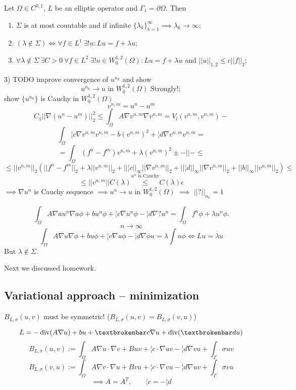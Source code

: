 \documentclass[12pt]{article}					%
\begin{document}
\begin{veta}
	Let $\Omega \in C^{0, 1}$, $L$ be an elliptic operator and $\Gamma_1 = \partial \Omega$. Then
	\begin{enumerate}
		\item $\Sigma$ is at most countable and if infinite $\{\lambda_k\}_{k=1}^∞ \implies \lambda_k \rightarrow ∞$;
		\item $(\lambda \notin \Sigma) \Leftrightarrow \forall f \in L^1\ \exists! u: Lu = f + \lambda u$;
		\item $\forall \lambda \notin \Sigma\ \exists C > 0\ \forall f \in L^2\ \exists! u \in W_0^{1,2}(\Omega): Lu = f + \lambda u$ and $||u||_{1,2} ≤ c ||f||_2$;
	\end{enumerate}

	\begin{dukazin}
		3) TODO
		improve convergence of $u^{n_k}$ and show
		$$ u^{n_k} \rightarrow u \text{ in } W_0^{1, 2}(\Omega) \text{ Strongly!}; $$
		show $\{u^{n_k}\}$ is Cauchy in $W_0^{1, 2}(\Omega)$
		$$ v^{n, m} = u^n - u^m $$
		$$ C_1||\nabla (u^n - u^m)||_2^2 ≤ \int_{\Omega} A \nabla v^{n, m} \nabla v^{n, m} = V_l(v^{n, m}, v^{n, m}) - $$
		$$ \int_\Omega ¦c \nabla  v^{n, m}v^{n, m} - b(v^{n, m})^2 + ¦d \nabla v^{n, m}v^{n, m} = $$
		$$ = \int_\Omega (f^n - f^m) v^{n, m} + \lambda(v^{n, m})^2 ± -||- ≤ $$
		$$ ≤ ||v^{n, m}||_2 (||f^n - f^m||_2 + \lambda ||v^{n, m}||_2 + ||¦c||_∞ ||\nabla v^{n, m}||_2 + ||¦d||_∞ ||\nabla v^{n, m}||_2 + ||b||_∞ ||v^{n, m}||_2) ≤$$
		$$ ≤ ||v^{n, m}|| C(\lambda) \overset{u^n \text{ is Cauchy}} ≤ C(\lambda) \epsilon $$
		$\implies \nabla u^n$ is Cauchy sequence $\implies u^n \rightarrow u$ in $W_0^{1, 2}(\Omega)$ $\implies$ $||?||_{n_k} = 1$

		$$ \int_\Omega A \nabla a u^n \nabla a \phi + b u^n \phi + ¦c \nabla u^n \phi - ¦d \nabla ? u^n = \int_\Omega f^n \phi + \lambda u^n \phi. $$
		$$ n \rightarrow ∞ $$
		$$ \int_\Omega A \nabla u \nabla \phi + b u \phi + ¦c \nabla u \phi - ¦d \nabla \phi u = \lambda \int u \phi \Leftrightarrow Lu = \lambda u $$
		But $\lambda \notin \Sigma$.
	\end{dukazin}
\end{veta}

\begin{poznamka}
	Next we discussed homework.
\end{poznamka}


\subsection{Variational approach – minimization}
\begin{poznamka}
	$B_{L, \sigma}(u, v)$ must be symmetric! ($B_{L, \sigma}(u, v) = B_{L, \sigma}(v, u)$)

	$$ L = - \Div (A \nabla u) + b u + ¦c \nabla u + \Div (¦d u) $$
	$$ B_{L, \sigma}(u, v) := \int_{\Omega} A \nabla u·\nabla v + B u v + ¦c·\nabla u v - ¦d \nabla v u + \int_{\Gamma} \sigma u v $$
	$$ B_{L, \sigma}(v, u) := \int_{\Omega} A \nabla v·\nabla u + B v u + ¦c·\nabla v u - ¦d \nabla u v + \int_{\Gamma} \sigma v u $$
	$$ \implies A = A^T, \qquad ¦c = -¦d $$
\end{poznamka}
\end{document}
